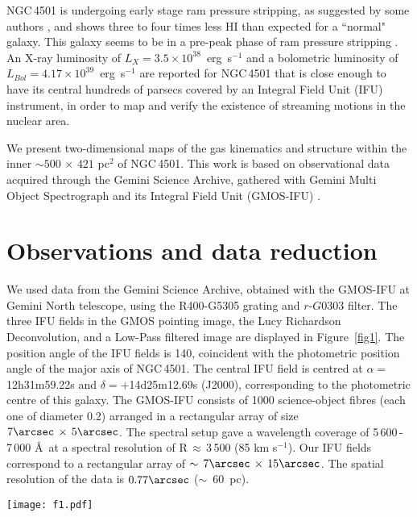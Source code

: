 \documentclass[fleqn,usenatbib]{mnras}
\begin{document}
NGC\,4501 is undergoing early stage ram pressure stripping, as suggested by some authors \citep{Kenney2004, Crowl2005, Vollmer2007, Vollmer2008, Vollmer2009, Vollmer2012}, and shows 
three to four times less HI than expected for a ``normal" galaxy. This galaxy seems to be in a pre-peak phase of ram pressure stripping \citep{Vollmer2008}. An X-ray luminosity of 
\mbox{$L_X=3.5\times10^{38}$ erg s$^{-1}$} \citep{Li2013} and a bolometric luminosity of \mbox{$L_{Bol}=4.17\times10^{39}$ erg s$^{-1}$} \citep{Wu2013} are reported for NGC\,4501 that is 
close enough to have its central hundreds of parsecs covered by an Integral Field Unit (IFU) instrument, in order to map and verify the existence of streaming motions in the nuclear area. 

We present two-dimensional maps of the gas kinematics and structure within the inner $\sim 500\,\times\,421$ pc$^2$ of NGC\,4501. This work is based on observational 
data acquired through the Gemini Science Archive, gathered with Gemini Multi Object Spectrograph and its Integral Field Unit (GMOS-IFU) \citep{Allington-Smith2002}.

\section{Observations and data reduction}\label{sec:s2}

We used data from the Gemini Science Archive, obtained with the GMOS-IFU at Gemini North telescope, using the R400-G5305 grating and $r$-$G0303$ filter. 
The three IFU fields in the GMOS pointing image, the Lucy Richardson Deconvolution, and a Low-Pass filtered image are displayed in 
Figure~\ref{fig1}. The position angle of the IFU fields is 140\degr, coincident with the photometric position angle of the major axis of NGC\,4501. The central IFU field
is centred at $\alpha=$12h31m59.22s and $\delta=$+14d25m12.69s (J2000), corresponding to the photometric centre of this galaxy. The GMOS-IFU consists of 1000 
science-object fibres (each one of diameter 0.2\arcsec) arranged in a rectangular array of size $7\arcsec\,\times\,5\arcsec$. The spectral setup gave a 
wavelength coverage of 5\,600\,-\,7\,000 \AA\, at a spectral resolution of R$\,\approx\,$3\,500 (85 km s$^{-1}$). Our IFU fields correspond to a rectangular array 
of $\sim\,7\arcsec\, \times\, 15\arcsec$. The spatial resolution of the data is $0.77\arcsec$ \mbox{($\sim$ 60 pc)}. 

\begin{figure*}
\hspace*{-1.8cm}
\texttt{[image: f1.pdf]}
\caption{(a): Original optical 10-min exposure GMOS-N image in the r-G0303 filter, P.A.=140\degr . 
(b): Lucy-Richardson deconvolution applied to the same image. 
(c): Low-Pass filtered image. 
The three IFU fields are outlined by black boxes. The colorbar units are counts.}
\label{fig1}
\end{figure*}
\end{document}
